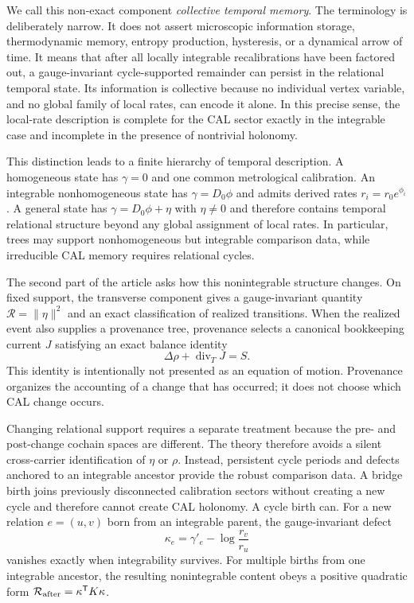 We call this non-exact component \emph{collective temporal memory}. The terminology is deliberately narrow. It does not assert microscopic information storage, thermodynamic memory, entropy production, hysteresis, or a dynamical arrow of time. It means that after all locally integrable recalibrations have been factored out, a gauge-invariant cycle-supported remainder can persist in the relational temporal state. Its information is collective because no individual vertex variable, and no global family of local rates, can encode it alone. In this precise sense, the local-rate description is complete for the CAL sector exactly in the integrable case and incomplete in the presence of nontrivial holonomy.

This distinction leads to a finite hierarchy of temporal description. A homogeneous state has $\gamma=0$ and one common metrological calibration. An integrable nonhomogeneous state has $\gamma=D_0\phi$ and admits derived rates $r_i=r_0e^{\phi_i}$. A general state has $\gamma=D_0\phi+\eta$ with $\eta\neq0$ and therefore contains temporal relational structure beyond any global assignment of local rates. In particular, trees may support nonhomogeneous but integrable comparison data, while irreducible CAL memory requires relational cycles.

The second part of the article asks how this nonintegrable structure changes. On fixed support, the transverse component gives a gauge-invariant quantity $\mathcal R=\|\eta\|^2$ and an exact classification of realized transitions. When the realized event also supplies a provenance tree, provenance selects a canonical bookkeeping current $J$ satisfying an exact balance identity
\begin{equation}
\Delta\rho+\operatorname{div}_T J=S.
\label{eq:intro-balance}
\end{equation}
This identity is intentionally not presented as an equation of motion. Provenance organizes the accounting of a change that has occurred; it does not choose which CAL change occurs.

Changing relational support requires a separate treatment because the pre- and post-change cochain spaces are different. The theory therefore avoids a silent cross-carrier identification of $\eta$ or $\rho$. Instead, persistent cycle periods and defects anchored to an integrable ancestor provide the robust comparison data. A bridge birth joins previously disconnected calibration sectors without creating a new cycle and therefore cannot create CAL holonomy. A cycle birth can. For a new relation $e=(u,v)$ born from an integrable parent, the gauge-invariant defect
\begin{equation}
\kappa_e=\gamma'_e-\log\frac{r_v}{r_u}
\label{eq:intro-kappa}
\end{equation}
vanishes exactly when integrability survives. For multiple births from one integrable ancestor, the resulting nonintegrable content obeys a positive quadratic form $\mathcal R_{\rm after}=\kappa^{\mathsf T}K\kappa$.

